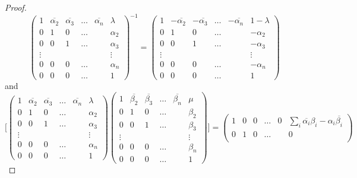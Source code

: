 \documentclass[10pt,a4paper]{amsart}
\begin{document}
\begin{proof}
		$$\begin{pmatrix}
			1 & \overline{\alpha_2} & \overline{\alpha_3} & \ldots & \overline{\alpha_n} & \lambda \\
			0 & 1 & 0 & \ldots & & \alpha_2 \\
			0 & 0 & 1 & \ldots & & \alpha_3 \\
			\vdots & & & & & \vdots \\
			0 & 0 & 0 & \ldots & & \alpha_n \\
			0 & 0 & 0 & \ldots & & 1
		\end{pmatrix}^{-1} =  \begin{pmatrix}
			1 & -\overline{\alpha_2} & -\overline{\alpha_3} & \ldots & -\overline{\alpha_n} & 1-\lambda \\
			0 & 1 & 0 & \ldots & & -\alpha_2 \\
			0 & 0 & 1 & \ldots & & -\alpha_3 \\
			\vdots & & & & & \vdots \\
			0 & 0 & 0 & \ldots & & -\alpha_n \\
			0 & 0 & 0 & \ldots & & 1
		\end{pmatrix}$$
		and 
		$$\Big[ \begin{pmatrix}
			1 & \overline{\alpha_2} & \overline{\alpha_3} & \ldots & \overline{\alpha_n} & \lambda \\
			0 & 1 & 0 & \ldots & & \alpha_2 \\
			0 & 0 & 1 & \ldots & & \alpha_3 \\
			\vdots & & & & & \vdots \\
			0 & 0 & 0 & \ldots & & \alpha_n \\
			0 & 0 & 0 & \ldots & & 1
		\end{pmatrix} 
		\begin{pmatrix}
			1 & \overline{\beta_2} & \overline{\beta_3} & \ldots & \overline{\beta_n} & \mu \\
			0 & 1 & 0 & \ldots & & \beta_2 \\
			0 & 0 & 1 & \ldots & & \beta_3 \\
			\vdots & & & & & \vdots \\
			0 & 0 & 0 & \ldots & & \beta_n \\
			0 & 0 & 0 & \ldots & & 1
		\end{pmatrix} \Big] = \begin{pmatrix}
			1 & 0 & 0 & \ldots & 0 & \sum_i \overline{\alpha_i}\beta_i - \alpha_i \overline{\beta_i} \\
			0 & 1 & 0 & \ldots & & 0 \\

\end{pmatrix}$$
\end{proof}
\end{document}
